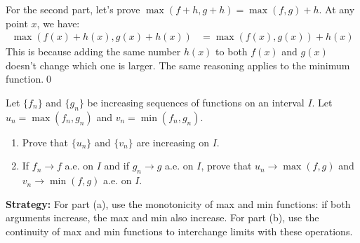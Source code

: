 For the second part, let's prove $\max(f + h, g + h) = \max(f, g) + h$. At any point $x$, we have:
\begin{align*}
\max(f(x) + h(x), g(x) + h(x)) &= \max(f(x), g(x)) + h(x)
\end{align*}
This is because adding the same number $h(x)$ to both $f(x)$ and $g(x)$ doesn't change which one is larger. The same reasoning applies to the minimum function.\qed


\begin{problembox}
Let $\{f_n\}$ and $\{g_n\}$ be increasing sequences of functions on an interval $I$. Let $u_n = \max(f_n, g_n)$ and $v_n = \min(f_n, g_n)$.
\begin{enumerate}[label=(\alph*)]
\item Prove that $\{u_n\}$ and $\{v_n\}$ are increasing on $I$.
\item If $f_n \to f$ a.e. on $I$ and if $g_n \to g$ a.e. on $I$, prove that $u_n \to \max(f, g)$ and $v_n \to \min(f, g)$ a.e. on $I$.
\end{enumerate}
\end{problembox}

\noindent\textbf{Strategy:} For part (a), use the monotonicity of max and min functions: if both arguments increase, the max and min also increase. For part (b), use the continuity of max and min functions to interchange limits with these operations.

